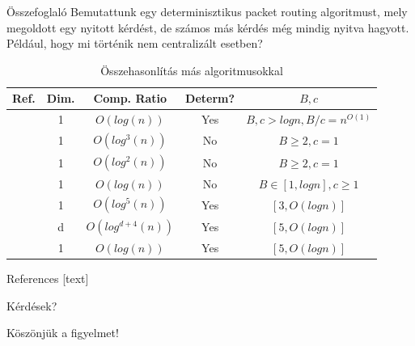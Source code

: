 \documentclass[10pt]{beamer}
\begin{document}
\begin{frame}{Összefoglaló}
  Bemutattunk egy determinisztikus packet routing algoritmust, mely megoldott egy nyitott kérdést, de számos más kérdés még mindig nyitva hagyott. Például, hogy mi történik nem centralizált esetben?
  \begin{table}
  	\begin{tabular}{ c c c c c }
  		\toprule
  		Ref. & Dim. & Comp. Ratio & Determ? & $ B, c $ \\
  		\midrule
  			\cite{even2010logn, even2011online, evenM14} & 1 & $ O(log(n)) $ & Yes & $ B, c > log n, B/c = n^{O(1)} $ \\
  			\cite{angelov2009network} & 1 & $ O(log^3(n)) $ & No & $ B \geq 2, c = 1 $ \\
			\cite{azar2005packet} & 1 & $ O(log^2(n)) $ & No & $ B \geq 2, c = 1 $ \\
			\cite{even2010logn, evenM14} & 1 & $ O(log(n)) $ & No & $ B \in [1, log n], c \geq 1 $ \\
			\cite{even2011online, evenM14} & 1 & $ O(log^5(n)) $ & Yes & $ [3, O(log n)] $ \\
			\cite{even2011online, evenM14} & d & $ O(log^{d+4}(n)) $ & Yes & $ [5, O(log n)] $ \\
			\hline
			\cite{even2015better} & 1 & $ O(log(n)) $ & Yes & $ [5, O(log n)] $ \\
		\bottomrule
	\end{tabular}
	\caption{Összehasonlítás más algoritmusokkal}
  \end{table}
\end{frame}

\appendix

\begin{frame}[allowframebreaks]{References}
	[text]
	
	
	
\end{frame}

\begin{frame}[standout]
  Kérdések?
\end{frame}

\begin{frame}[standout]
	Köszönjük a figyelmet!
\end{frame}
\end{document}

